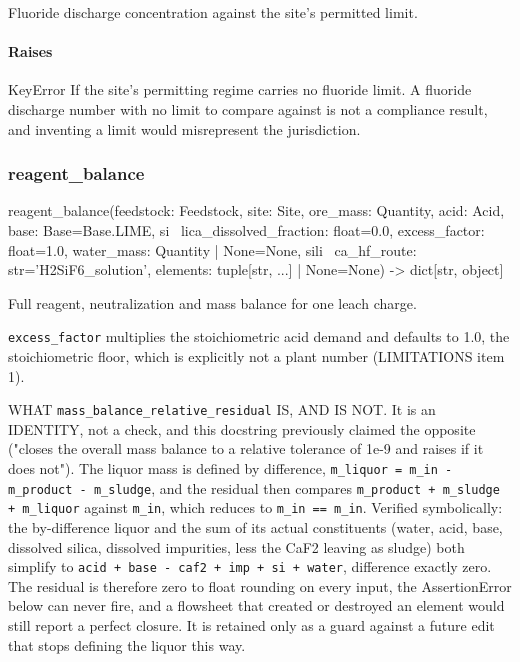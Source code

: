 \documentclass[10pt,a4paper,twoside]{report}
\begin{document}
Fluoride discharge concentration against the site's permitted limit.

\paragraph*{Raises}

KeyError If the site's permitting regime carries no fluoride limit. A fluoride discharge number with no limit to compare against is not a compliance result, and inventing a limit would misrepresent the jurisdiction.

\subsubsection*{reagent\_balance}

\begin{verbatimsmall}
reagent_balance(feedstock: Feedstock, site: Site, ore_mass: Quantity, acid: Acid, base: Base=Base.LIME, si
    \ lica_dissolved_fraction: float=0.0, excess_factor: float=1.0, water_mass: Quantity | None=None, sili
    \ ca_hf_route: str='H2SiF6_solution', elements: tuple[str, ...] | None=None) -> dict[str, object]
\end{verbatimsmall}

Full reagent, neutralization and mass balance for one leach charge.

\texttt{excess\_factor} multiplies the stoichiometric acid demand and defaults to 1.0, the stoichiometric floor, which is explicitly not a plant number (LIMITATIONS item 1).

WHAT \texttt{mass\_balance\_relative\_residual} IS, AND IS NOT. It is an IDENTITY, not a check, and this docstring previously claimed the opposite ("closes the overall mass balance to a relative tolerance of 1e-9 and raises if it does not"). The liquor mass is defined by difference, \texttt{m\_liquor = m\_in - m\_product - m\_sludge}, and the residual then compares \texttt{m\_product + m\_sludge + m\_liquor} against \texttt{m\_in}, which reduces to \texttt{m\_in == m\_in}. Verified symbolically: the by-difference liquor and the sum of its actual constituents (water, acid, base, dissolved silica, dissolved impurities, less the CaF2 leaving as sludge) both simplify to \texttt{acid + base - caf2 + imp + si + water}, difference exactly zero. The residual is therefore zero to float rounding on every input, the AssertionError below can never fire, and a flowsheet that created or destroyed an element would still report a perfect closure. It is retained only as a guard against a future edit that stops defining the liquor this way.
\end{document}
